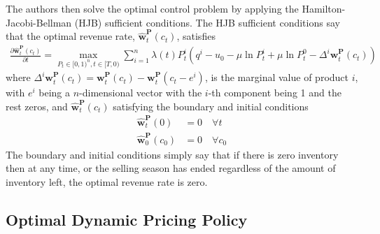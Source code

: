 The authors then solve the optimal control problem by applying the Hamilton-Jacobi-Bellman (HJB) sufficient conditions. The HJB sufficient conditions say that the optimal revenue rate, $\hat{\mathbf{w}}_t^{\mathbf{P}}(c_t)$, satisfies
\begin{align}
\frac{\partial \hat{\mathbf{w}}_t^{\mathbf{P}}(c_t)}{\partial t} = \max_{P_t \in [0,1)^n, t \in [T,0)}\sum_{i=1}^{n} \lambda(t)P_t^i \left(q^i-u_0-\mu \ln P_t^i + \mu \ln P_t^0- \Delta^i \mathbf{w}_t^{\mathbf{P}}(c_t)\right)
\end{align}
where $\Delta^i \mathbf{w}_t^{\mathbf{P}}(c_t) = \mathbf{w}_t^{\mathbf{P}}(c_t) - \mathbf{w}_t^{\mathbf{P}}(c_t-e^i)$, is the marginal value of product $i$, with $e^i$ being a $n$-dimensional vector with the $i$-th component being 1 and the rest zeros, and $\hat{\mathbf{w}}_t^{\mathbf{P}}(c_t)$ satisfying the boundary and initial conditions
\begin{align}
\hat{\mathbf{w}}_t^{\mathbf{P}}(0) &= 0 \quad \forall t\\
\hat{\mathbf{w}}_0^{\mathbf{P}}(c_0) &= 0 \quad \forall c_0
\end{align}
The boundary and initial conditions simply say that if there is zero inventory then at any time, or the selling season has ended regardless of the amount of inventory left, the optimal revenue rate is zero.

\subsection{Optimal Dynamic Pricing Policy}

%

